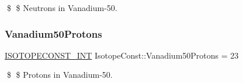 \$ \$ Neutrons in Vanadium-\/50. \mbox{\label{group___isotope_const-_vanadium-_v50_ga3a43a9c40781ae97817a1b8ffc01f5f9}} 
\subsubsection{\texorpdfstring{Vanadium50\+Protons}{Vanadium50Protons}}
{\footnotesize\ttfamily \mbox{\hyperlink{group___isotope_const-_macros_ga5f18360b3e99483a35c32d789e62621c}{I\+S\+O\+T\+O\+P\+E\+C\+O\+N\+S\+T\+\_\+\+I\+NT}} Isotope\+Const\+::\+Vanadium50\+Protons = 23}

\$ \$ Protons in Vanadium-\/50. 